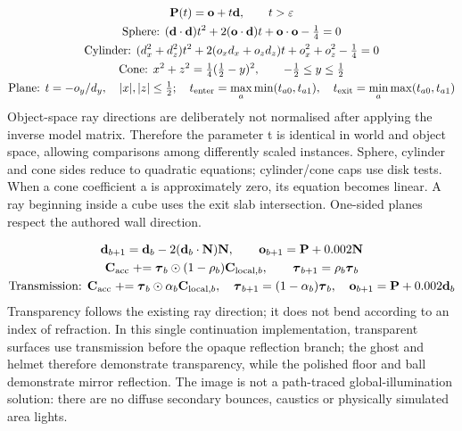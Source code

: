 \documentclass[12pt,a4paper]{article}
\begin{document}
{\small\begin{equation}\begin{gathered}
\mathbf P(t)=\mathbf o+t\mathbf d,\qquad t>\varepsilon\\
\text{Sphere: }(\mathbf d\cdot\mathbf d)t^2+2(\mathbf o\cdot\mathbf d)t+\mathbf o\cdot\mathbf o-\tfrac14=0\\
\text{Cylinder: }(d_x^2+d_z^2)t^2+2(o_xd_x+o_zd_z)t+o_x^2+o_z^2-\tfrac14=0\\
\text{Cone: }x^2+z^2=\tfrac14(\tfrac12-y)^2,\qquad-\tfrac12\le y\le\tfrac12\\
\text{Plane: }t=-o_y/d_y,\quad |x|,|z|\le\tfrac12;\quad
t_{\rm enter}=\max_a\min(t_{a0},t_{a1}),\quad t_{\rm exit}=\min_a\max(t_{a0},t_{a1})
\end{gathered}\label{eq:15}\end{equation}}
Object-space ray directions are deliberately not normalised after applying the inverse model matrix. Therefore the parameter t is identical in world and object space, allowing comparisons among differently scaled instances. Sphere, cylinder and cone sides reduce to quadratic equations; cylinder/cone caps use disk tests. When a cone coefficient a is approximately zero, its equation becomes linear. A ray beginning inside a cube uses the exit slab intersection. One-sided planes respect the authored wall direction.

{\small\begin{equation}\begin{gathered}
\mathbf d_{b+1}=\mathbf d_b-2(\mathbf d_b\cdot\mathbf N)\mathbf N,\qquad
\mathbf o_{b+1}=\mathbf P+0.002\mathbf N\\
\mathbf C_{\rm acc}\mathrel{+}=\boldsymbol\tau_b\odot(1-\rho_b)\mathbf C_{{\rm local},b},\qquad
\boldsymbol\tau_{b+1}=\rho_b\boldsymbol\tau_b\\
\text{Transmission: }\mathbf C_{\rm acc}\mathrel{+}=\boldsymbol\tau_b\odot\alpha_b\mathbf C_{{\rm local},b},\quad
\boldsymbol\tau_{b+1}=(1-\alpha_b)\boldsymbol\tau_b,\quad\mathbf o_{b+1}=\mathbf P+0.002\mathbf d_b
\end{gathered}\label{eq:16}\end{equation}}
Transparency follows the existing ray direction; it does not bend according to an index of refraction. In this single continuation implementation, transparent surfaces use transmission before the opaque reflection branch; the ghost and helmet therefore demonstrate transparency, while the polished floor and ball demonstrate mirror reflection. The image is not a path-traced global-illumination solution: there are no diffuse secondary bounces, caustics or physically simulated area lights.
\end{document}
